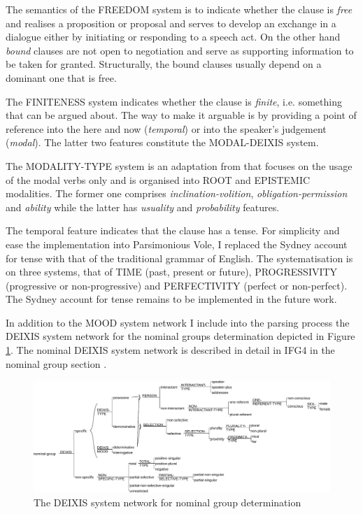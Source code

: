     The semantics of the FREEDOM system is to indicate whether the clause is \textit{free} and realises a proposition or proposal and serves to develop an exchange in a dialogue either by initiating or responding to a speech act. On the other hand \textit{bound} clauses are not open to negotiation and serve as supporting information to be taken for granted. Structurally, the bound clauses usually depend on a dominant one that is free.
    
    The FINITENESS system indicates whether the clause is \textit{finite}, i.e. something that can be argued about. The way to make it arguable is by providing a point of reference into the here and now (\textit{temporal}) or into the speaker's judgement (\textit{modal}). The latter two features constitute the MODAL-DEIXIS system. 
    
    The MODALITY-TYPE system is an adaptation from \citet[689--692]{Halliday2013} that focuses on the usage of the modal verbs only and is organised into ROOT and EPISTEMIC modalities. The former one comprises \textit{inclination-volition}, \textit{obligation-permission} and \textit{ability} while the latter has \textit{usuality} and \textit{probability} features.
    
    The temporal feature indicates that the clause has a tense. For simplicity and ease the implementation into Parsimonious Vole, I replaced the Sydney account for tense with that of the traditional grammar of English. The systematisation is on three systems, that of TIME (past, present or future), PROGRESSIVITY (progressive or non-progressive) and PERFECTIVITY (perfect or non-perfect). The Sydney account for tense remains to be implemented in the future work.    
    
    In addition to the MOOD system network I include into the parsing process the DEIXIS system network for the nominal groups determination depicted in Figure \ref{fig:ng-determination}. The nominal DEIXIS system network is described in detail in IFG4 in the nominal group section \citep[364--396]{Halliday2013}. 
    
    \begin{figure}[!ht]
        \centering
        \includegraphics[width=\linewidth]{Figures/SFL-grammar/determination-system.pdf}
        \caption{The DEIXIS system network for nominal group determination \citep[366]{Halliday2013}}
        \label{fig:ng-determination}
    \end{figure}

